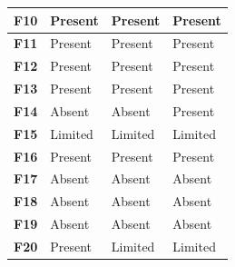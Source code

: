 \documentclass[thesis=B,english]{FITthesis}[2012/10/20]
\begin{document}
\begin{tabular}{|l|l|l|l|}
\textbf{F10}                                                               & Present                               & Present                            & Present                                 \\ \hline
\textbf{F11}                                                               & Present                               & Present                            & Present                                 \\ \hline
\textbf{F12}                                                               & Present                               & Present                            & Present                                 \\ \hline
\textbf{F13}                                                               & Present                               & Present                            & Present                                 \\ \hline
\textbf{F14}                                                               & Absent                                & Absent                             & Present                                 \\ \hline
\textbf{F15}                                                               & Limited                               & Limited                            & Limited                                 \\ \hline
\textbf{F16}                                                               & Present                               & Present                            & Present                                 \\ \hline
\textbf{F17}                                                               & Absent                                & Absent                             & Absent                                  \\ \hline
\textbf{F18}                                                               & Absent                                & Absent                             & Absent                                  \\ \hline
\textbf{F19}                                                               & Absent                                & Absent                             & Absent                                  \\ \hline
\textbf{F20}                                                               & Present                               & Limited                            & Limited                                 \\ \hline

\end{tabular}
\end{document}
